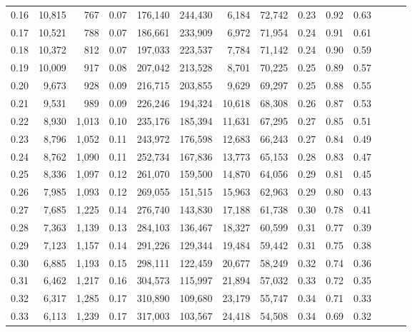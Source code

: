 \begin{tabular}{rrrrrrrrrrrrrr}
0.16 &  10,815 &    767 &  0.07 &  176,140 &  244,430 &   6,184 &  72,742 &  0.23 &  0.92 &      0.63 \\
0.17 &  10,521 &    788 &  0.07 &  186,661 &  233,909 &   6,972 &  71,954 &  0.24 &  0.91 &      0.61 \\
0.18 &  10,372 &    812 &  0.07 &  197,033 &  223,537 &   7,784 &  71,142 &  0.24 &  0.90 &      0.59 \\
0.19 &  10,009 &    917 &  0.08 &  207,042 &  213,528 &   8,701 &  70,225 &  0.25 &  0.89 &      0.57 \\
0.20 &   9,673 &    928 &  0.09 &  216,715 &  203,855 &   9,629 &  69,297 &  0.25 &  0.88 &      0.55 \\
0.21 &   9,531 &    989 &  0.09 &  226,246 &  194,324 &  10,618 &  68,308 &  0.26 &  0.87 &      0.53 \\
0.22 &   8,930 &  1,013 &  0.10 &  235,176 &  185,394 &  11,631 &  67,295 &  0.27 &  0.85 &      0.51 \\
0.23 &   8,796 &  1,052 &  0.11 &  243,972 &  176,598 &  12,683 &  66,243 &  0.27 &  0.84 &      0.49 \\
0.24 &   8,762 &  1,090 &  0.11 &  252,734 &  167,836 &  13,773 &  65,153 &  0.28 &  0.83 &      0.47 \\
0.25 &   8,336 &  1,097 &  0.12 &  261,070 &  159,500 &  14,870 &  64,056 &  0.29 &  0.81 &      0.45 \\
0.26 &   7,985 &  1,093 &  0.12 &  269,055 &  151,515 &  15,963 &  62,963 &  0.29 &  0.80 &      0.43 \\
0.27 &   7,685 &  1,225 &  0.14 &  276,740 &  143,830 &  17,188 &  61,738 &  0.30 &  0.78 &      0.41 \\
0.28 &   7,363 &  1,139 &  0.13 &  284,103 &  136,467 &  18,327 &  60,599 &  0.31 &  0.77 &      0.39 \\
0.29 &   7,123 &  1,157 &  0.14 &  291,226 &  129,344 &  19,484 &  59,442 &  0.31 &  0.75 &      0.38 \\
0.30 &   6,885 &  1,193 &  0.15 &  298,111 &  122,459 &  20,677 &  58,249 &  0.32 &  0.74 &      0.36 \\
0.31 &   6,462 &  1,217 &  0.16 &  304,573 &  115,997 &  21,894 &  57,032 &  0.33 &  0.72 &      0.35 \\
0.32 &   6,317 &  1,285 &  0.17 &  310,890 &  109,680 &  23,179 &  55,747 &  0.34 &  0.71 &      0.33 \\
0.33 &   6,113 &  1,239 &  0.17 &  317,003 &  103,567 &  24,418 &  54,508 &  0.34 &  0.69 &      0.32 \\

\end{tabular}
